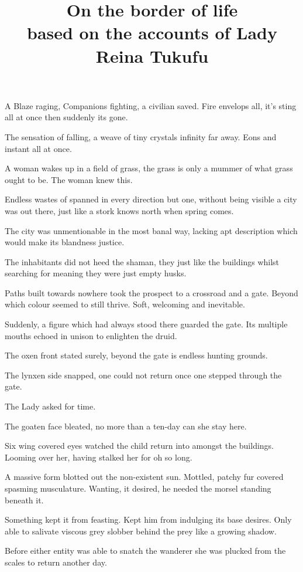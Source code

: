 \documentclass{article}
\title{On the border of life\\
\large based on the accounts of Lady Reina Tukufu}
\date{}
\begin{document}
    
    \maketitle

    A Blaze raging, Companions fighting, a civilian saved. Fire envelops all, it's sting all at once then suddenly its gone.

    The sensation of falling, a weave of tiny crystals infinity far away. Eons and instant all at once.

    A woman wakes up in a field of grass, the grass is only a mummer of what grass ought to be. The woman knew this.

    Endless wastes of spanned in every direction but one, without being visible a city was out there, just like a stork knows north when spring comes.

    The city was unmentionable in the most banal way, lacking apt description which would make its blandness justice. 

    The inhabitants did not heed the shaman, they just like the buildings whilst searching for meaning they were just empty husks.

    Paths built towards nowhere took the prospect to a crossroad and a gate. Beyond which colour seemed to still thrive. Soft, welcoming and inevitable.

    Suddenly, a figure which had always stood there guarded the gate. Its multiple mouths echoed in unison to enlighten the druid. 

    The oxen front stated surely, beyond the gate is endless hunting grounds.

    The lynxen side snapped, one could not return once one stepped through the gate.

    The Lady asked for time.

    The goaten face bleated, no more than a ten-day can she stay here.

    Six wing covered eyes watched the child return into amongst the buildings. Looming over her, having stalked her for oh so long.

    A massive form blotted out the non-existent sun. Mottled, patchy fur covered spasming musculature. Wanting, it desired, he needed the morsel standing beneath it.

    Something kept it from feasting. Kept him from indulging its base desires. Only able to salivate viscous grey slobber behind the prey like a growing shadow. 

    Before either entity was able to snatch the wanderer she was plucked from the scales to return another day.
\end{document}
